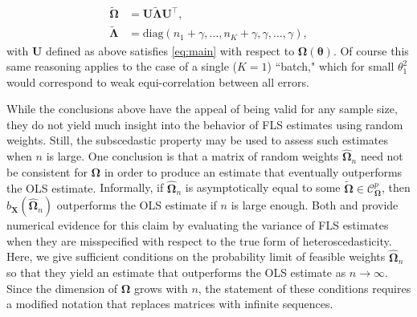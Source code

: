\documentclass[12pt]{article}
\newcommand{\bl}[1]{{\mathbf #1}}
\newcommand{\bs}[1]{\boldsymbol #1}
\begin{document}
{\begin{equation*}
\begin{aligned}
    \tilde{\bs{\Omega}} &= \bl{U} \tilde{\bs{\Lambda}} \bl{U}^\top, \\
    \tilde{\bs{\Lambda}} &= \mathrm{diag}(n_1 +\gamma, \dots, n_K +\gamma, \gamma, \dots, \gamma),
\end{aligned}
\end{equation*}
with $\bl{U}$ defined as above satisfies \eqref{eq:main} with respect to $\bs{\Omega}(\bs{\theta})$. Of course this same reasoning applies to the case of a single ($K=1$) ``batch," which for small $\theta_1^2$ would correspond to weak equi-correlation between all errors.}


While the conclusions above have the appeal of being valid for any sample size, they do not yield much insight into the behavior of FLS estimates using random weights. Still, the subscedastic property may be used to assess such estimates when $n$ is large. {One conclusion is that a matrix of random weights $\hat{\bs{\Omega}}_n$ need not be consistent for $\bs{\Omega}$ in order to produce an estimate that eventually outperforms the OLS estimate.} Informally, if $\hat{\bs{\Omega}}_n$ is asymptotically equal to some $\tilde{\bs{\Omega}} \in \mathcal{C}^p_{\bl{\Omega}}$, then $b_{\bl{X}}(\hat{\bs{\Omega}}_n)$ outperforms the OLS estimate if $n$ is large enough. Both \cite{atkinson_robust_2016} and \cite{romano_resurrecting_2017} provide numerical evidence for this claim by evaluating the variance of FLS estimates when they are misspecified with respect to the true form of heteroscedasticity. Here, we give sufficient conditions on the probability limit of feasible weights $\hat{\bs{\Omega}}_n$ so that they yield an estimate that outperforms the OLS estimate as $n \rightarrow \infty$. Since the dimension of $\bs{\Omega}$ grows with $n$, the statement of these conditions requires a modified notation that replaces matrices with infinite sequences. 
\end{document}
